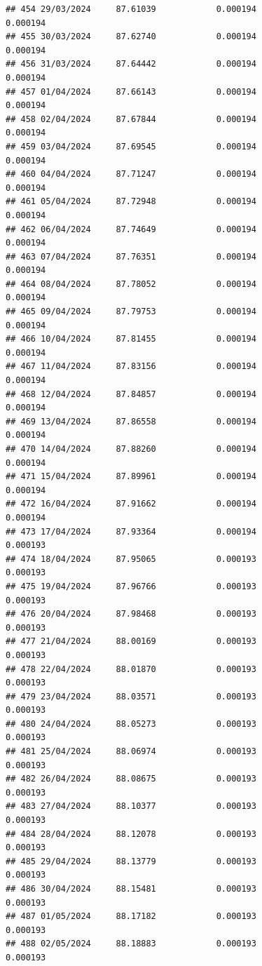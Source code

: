 \documentclass[
]{article}
\begin{document}
\begin{verbatim}
## 454 29/03/2024     87.61039            0.000194                0.000194
## 455 30/03/2024     87.62740            0.000194                0.000194
## 456 31/03/2024     87.64442            0.000194                0.000194
## 457 01/04/2024     87.66143            0.000194                0.000194
## 458 02/04/2024     87.67844            0.000194                0.000194
## 459 03/04/2024     87.69545            0.000194                0.000194
## 460 04/04/2024     87.71247            0.000194                0.000194
## 461 05/04/2024     87.72948            0.000194                0.000194
## 462 06/04/2024     87.74649            0.000194                0.000194
## 463 07/04/2024     87.76351            0.000194                0.000194
## 464 08/04/2024     87.78052            0.000194                0.000194
## 465 09/04/2024     87.79753            0.000194                0.000194
## 466 10/04/2024     87.81455            0.000194                0.000194
## 467 11/04/2024     87.83156            0.000194                0.000194
## 468 12/04/2024     87.84857            0.000194                0.000194
## 469 13/04/2024     87.86558            0.000194                0.000194
## 470 14/04/2024     87.88260            0.000194                0.000194
## 471 15/04/2024     87.89961            0.000194                0.000194
## 472 16/04/2024     87.91662            0.000194                0.000194
## 473 17/04/2024     87.93364            0.000194                0.000193
## 474 18/04/2024     87.95065            0.000193                0.000193
## 475 19/04/2024     87.96766            0.000193                0.000193
## 476 20/04/2024     87.98468            0.000193                0.000193
## 477 21/04/2024     88.00169            0.000193                0.000193
## 478 22/04/2024     88.01870            0.000193                0.000193
## 479 23/04/2024     88.03571            0.000193                0.000193
## 480 24/04/2024     88.05273            0.000193                0.000193
## 481 25/04/2024     88.06974            0.000193                0.000193
## 482 26/04/2024     88.08675            0.000193                0.000193
## 483 27/04/2024     88.10377            0.000193                0.000193
## 484 28/04/2024     88.12078            0.000193                0.000193
## 485 29/04/2024     88.13779            0.000193                0.000193
## 486 30/04/2024     88.15481            0.000193                0.000193
## 487 01/05/2024     88.17182            0.000193                0.000193
## 488 02/05/2024     88.18883            0.000193                0.000193

\end{verbatim}
\end{document}
